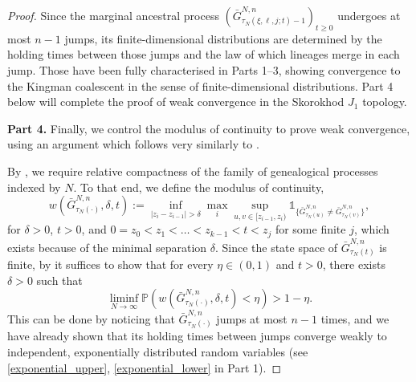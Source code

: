 \documentclass[a4paper,11pt]{article}
\theoremstyle{definition}
\newcommand{\bbP}{\mathbb{P}}
\begin{document}
\begin{proof}
Since the marginal ancestral process $( \bar{ G }_{ \tau_N( \xi, \ell, j; t ) - 1 }^{ N, n } )_{t \geq 0}$ undergoes at most $n - 1$ jumps, its finite-dimensional distributions are determined by the holding times between those jumps and the law of which lineages merge in each jump.
Those have been fully characterised in Parts 1--3, showing convergence to the Kingman coalescent in the sense of finite-dimensional distributions.
Part 4 below will complete the proof of weak convergence in the Skorokhod $J_1$ topology.

\textbf{Part 4.} Finally, we control the modulus of continuity to prove weak convergence, using an argument which follows very similarly to \cite[Proof of Theorem 3.1]{mohle1999}.

By \cite[Corollary 7.8, Chapter 3]{ethier/kurtz:1986}, we require relative compactness of the family of genealogical processes indexed by $N$.
To that end, we define the modulus of continuity,
\begin{equation*}
w( \bar{ G }_{ \tau_N( \cdot ) }^{ N, n }, \delta, t ) := \inf_{ | z_i - z_{ i - 1 } | > \delta } \max_i \sup_{ u, v \in [ z_{ i - 1 }, z_i ) } \mathds{ 1 }_{ \{ \bar{ G }_{ \tau_N( u ) }^{ N, n } \neq \bar{ G }_{ \tau_N( v ) }^{ N, n } \} },
\end{equation*}
for $\delta > 0$, $t > 0$, and $0 = z_0 < z_1 < \ldots < z_{ k - 1 } < t < z_j$ for some finite $j$, which exists because of the minimal separation $\delta$.
Since the state space of $\bar{ G }_{ \tau_N( t ) }^{ N, n }$ is finite, by \cite[Corollary 7.4, Chapter 3]{ethier/kurtz:1986} it suffices to show that for every $\eta \in ( 0, 1 )$ and $t > 0$, there exists $\delta > 0$ such that
\begin{equation}\label{eq:modulus_of_continuity}
\liminf_{ N \to \infty } \bbP( w( \bar{ G }_{ \tau_N( \cdot ) }^{ N, n }, \delta, t ) < \eta ) > 1 - \eta.
\end{equation}
This can be done by noticing that $\bar{ G }_{ \tau_N( \cdot ) }^{ N, n }$ jumps at most $n - 1$ times, and we have already shown that its holding times between jumps converge weakly to independent, exponentially distributed random variables (see \eqref{exponential_upper}, \eqref{exponential_lower} in Part 1).


\end{proof}
\end{document}
